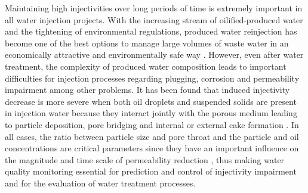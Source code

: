 \documentclass[10pt,authoryear,twocolumn]{article}
\DeclareRobustCommand{\hlcolor}[2][yellow]{{\sethlcolor{#1}\hl{#2}}}
\begin{document}
Maintaining high injectivities over long periods of time is extremely important in all water injection projects. With the increasing stream of oilified-produced water and the tightening of environmental regulations, produced water reinjection has become one of the best options to manage large volumes of waste water in an economically attractive and environmentally safe way \citep{Furtado2005,Souza2005,Abou-Sayed2007}. However, even after water treatment, the complexity of produced water composition leads to important difficulties for injection processes regarding plugging, corrosion and permeability impairment among other problems. It has been found that induced injectivity decrease is more severe when both oil droplets and suspended solids are present in injection water because they interact jointly with the porous medium leading to particle deposition, pore bridging and internal or external cake formation \citep{Bennion1998,Chaveteau1998,Reousseau2008,Ali2009}. In all cases, the ratio between particle size and pore throat and the particle and oil concentrations are critical parameters since they have an important influence on the magnitude and time scale of permeability reduction \citep{vanderBroek1999,Ali2007,Buret2010}, thus making water quality monitoring essential for prediction and control of injectivity impairment and for the evaluation of water treatment processes.

\end{document}
